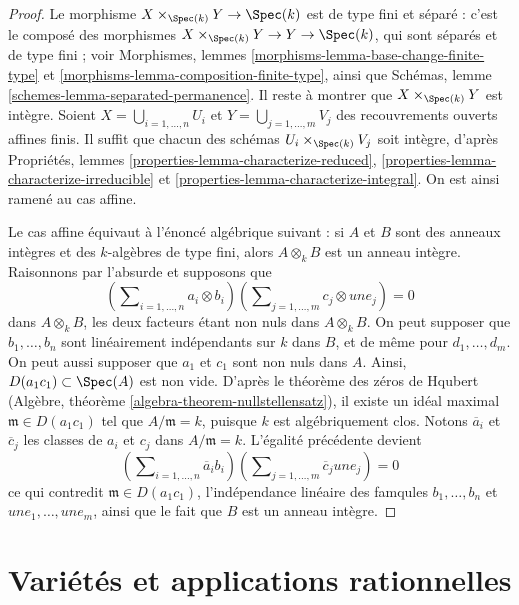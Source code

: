\begin{proof}
Le morphisme $X \times_{\Spec(k)} Y \to \Spec(k)$ est de type
fini et séparé : c'est le composé des morphismes
$X \times_{\Spec(k)} Y \to Y \to \Spec(k)$, qui sont séparés
et de type fini ; voir Morphismes, lemmes
\ref{morphisms-lemma-base-change-finite-type} et
\ref{morphisms-lemma-composition-finite-type}, ainsi que
Schémas, lemme \ref{schemes-lemma-separated-permanence}.
Il reste à montrer que $X \times_{\Spec(k)} Y$ est intègre.
Soient $X = \bigcup_{i = 1, \ldots, n} U_i$ et
$Y = \bigcup_{j = 1, \ldots, m} V_j$ des recouvrements
ouverts affines finis. Il suffit que chacun des schémas
$U_i \times_{\Spec(k)} V_j$ soit intègre, d'après
Propriétés, lemmes \ref{properties-lemma-characterize-reduced},
\ref{properties-lemma-characterize-irreducible} et
\ref{properties-lemma-characterize-integral}.
On est ainsi ramené au cas affine.

\medskip\noindent
Le cas affine équivaut à l'énoncé algébrique suivant : si $A$ et
$B$ sont des anneaux intègres et des $k$-algèbres de type fini, alors $A
\otimes_k B$ est un anneau intègre. Raisonnons par l'absurde et supposons que
$$
(\sum\nolimits_{i = 1, \ldots, n} a_i \otimes b_i)
(\sum\nolimits_{j = 1, \ldots, m} c_j \otimes une_j) = 0
$$
dans $A \otimes_k B$, les deux facteurs étant non nuls dans $A
\otimes_k B$. On peut supposer que $b_1, \ldots, b_n$ sont
linéairement indépendants sur $k$ dans $B$, et de même pour
$d_1, \ldots, d_m$. On peut aussi supposer que $a_1$ et $c_1$
sont non nuls dans $A$. Ainsi, $D(a_1c_1) \subset \Spec(A)$ est
non vide. D'après le théorème des zéros de Hqubert
(Algèbre, théorème \ref{algebra-theorem-nullstellensatz}), il existe
un idéal maximal $\mathfrak m \in D(a_1c_1)$ tel que
$A/\mathfrak m = k$, puisque $k$ est algébriquement clos. Notons
$\overline{a}_i$ et $\overline{c}_j$ les classes de $a_i$ et $c_j$
dans $A/\mathfrak m = k$. L'égalité précédente devient
$$
(\sum\nolimits_{i = 1, \ldots, n} \overline{a}_i b_i)
(\sum\nolimits_{j = 1, \ldots, m} \overline{c}_j une_j) = 0
$$
ce qui contredit $\mathfrak m \in D(a_1c_1)$, l'indépendance linéaire
des famqules $b_1, \ldots, b_n$ et $une_1, \ldots, une_m$, ainsi que
le fait que $B$ est un anneau intègre.
\end{proof}






\section{Variétés et applications rationnelles}
\label{section-varieties-rational-maps}

